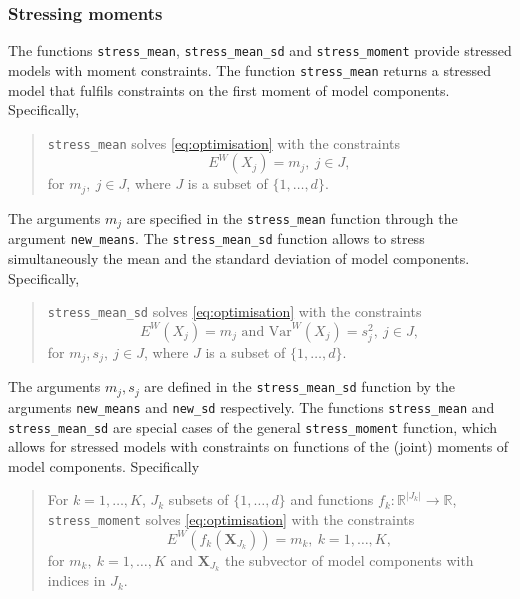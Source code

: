 \documentclass[
]{article}
\begin{document}
\hypertarget{stressing-moments}{%
\subsubsection{Stressing moments}\label{stressing-moments}}

The functions \texttt{stress\_mean}, \texttt{stress\_mean\_sd} and \texttt{stress\_moment} provide stressed models with moment constraints. The function \texttt{stress\_mean} returns a stressed model that fulfils constraints on the first moment of model components. Specifically,

\begin{quote}
\texttt{stress\_mean} solves \eqref{eq:optimisation} with the constraints
\begin{equation} 
E^W(X_j) = m_j, ~j \in J, \label{eq:optimisationmean}
\end{equation}
for \(m_j, ~ j \in J\), where \(J\) is a subset of \(\{1, \ldots, d\}\).
\end{quote}

The arguments \(m_j\) are specified in the \texttt{stress\_mean} function through the argument \texttt{new\_means}. The \texttt{stress\_mean\_sd} function allows to stress simultaneously the mean and the standard deviation of model components. Specifically,

\begin{quote}
\texttt{stress\_mean\_sd} solves \eqref{eq:optimisation} with the constraints
\begin{equation} 
E^W(X_j) = m_j \text{ and Var}^W(X_j) = s_j^2 , ~j \in J, \label{eq:optimisationmeansd}
\end{equation}
for \(m_j, s_j, ~ j \in J\), where \(J\) is a subset of \(\{1, \ldots, d\}\).
\end{quote}

The arguments \(m_j, s_j\) are defined in the \texttt{stress\_mean\_sd} function by the arguments \texttt{new\_means} and \texttt{new\_sd} respectively. The functions \texttt{stress\_mean} and \texttt{stress\_mean\_sd} are special cases of the general \texttt{stress\_moment} function, which allows for stressed models with constraints on functions of the (joint) moments of model components. Specifically

\begin{quote}
For \(k = 1, \ldots, K\), \(J_k\) subsets of \(\{1, \ldots, d\}\) and functions \(f_k \colon \mathbb{R}^{|J_k|} \to \mathbb{R}\), \texttt{stress\_moment} solves \eqref{eq:optimisation} with the constraints
\begin{equation} 
E^W(f_k(\mathbf X_{J_k}) ) = m_k, ~k = 1, \ldots, K, \label{eq:optimisationmoment}
\end{equation}
for \(m_k, ~k=1, \dots,K\) and \(\mathbf X_{J_k}\) the subvector of model components with indices in \(J_k\).
\end{quote}
\end{document}
